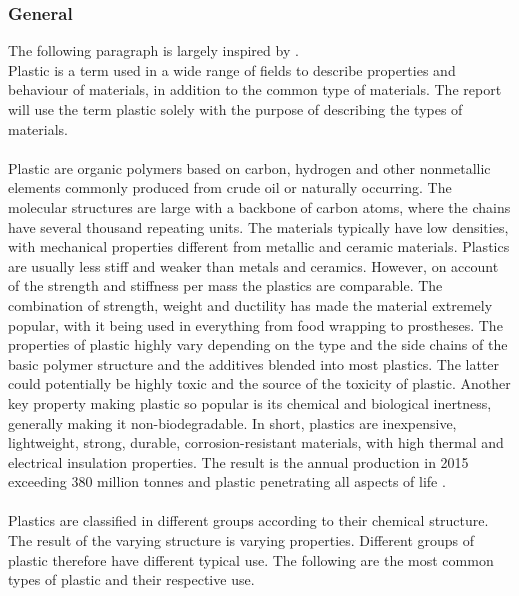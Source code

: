 \subsubsection{General} %
The following paragraph is largely inspired by \citet{Callister2007MaterialsBy}.\\ %
Plastic is a term used in a wide range of fields to describe properties and behaviour of materials, in addition to the common type of materials. The report will use the term plastic solely with the purpose of describing the types of materials.
\\
\\
Plastic are organic polymers based on carbon, hydrogen and other nonmetallic elements commonly produced from crude oil or naturally occurring. The molecular structures are large with a backbone of carbon atoms, where the chains have several thousand repeating units. The materials typically have low densities, with mechanical properties different from metallic and ceramic materials. Plastics are usually less stiff and weaker than metals and ceramics. However, on account of the strength and stiffness per mass the plastics are comparable. The combination of strength, weight and ductility has made the material extremely popular, with it being used in everything from food wrapping to prostheses. The properties of plastic highly vary depending on the type and the side chains of the basic polymer structure and the additives blended into most plastics. The latter could potentially be highly toxic and the source of the toxicity of plastic. Another key property making plastic so popular is its chemical and biological inertness, generally making it non-biodegradable. In short, plastics are inexpensive, lightweight, strong, durable, corrosion-resistant materials, with high thermal and electrical insulation properties. The result is the annual production in 2015 exceeding 380 million tonnes and plastic penetrating all aspects of life \citep{Geyer2017SupplmentaryMade}.
\\
\\
Plastics are classified in different groups according to their chemical structure. The result of the varying structure is varying properties. Different groups of plastic therefore have different typical use. The following are the most common types of plastic and their respective use. 
\\\\
